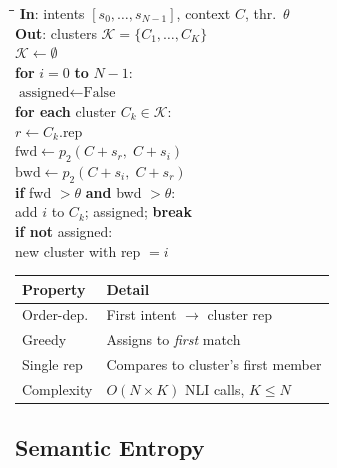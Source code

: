 \documentclass[10pt,a4paper,twocolumn]{article}
\begin{document}
\begin{algobox}[title=Greedy Sequential Clustering]
\begin{scriptsize}
\begin{tabbing}
\hspace{3mm}\=\hspace{3mm}\=\hspace{3mm}\=\kill
\textbf{In}: intents $[s_0, \ldots, s_{N-1}]$, context $C$, thr.\ $\theta$\\[2pt]
\textbf{Out}: clusters $\mathcal{K} = \{C_1, \ldots, C_K\}$\\[4pt]
$\mathcal{K} \leftarrow \emptyset$\\
\textbf{for} $i = 0$ \textbf{to} $N{-}1$:\\
\> $\text{assigned} \leftarrow \text{False}$\\
\> \textbf{for each} cluster $C_k \in \mathcal{K}$:\\
\>\> $r \leftarrow C_k.\text{rep}$\\
\>\> $\text{fwd} \leftarrow p_2(C{+}s_r,\; C{+}s_i)$\\
\>\> $\text{bwd} \leftarrow p_2(C{+}s_i,\; C{+}s_r)$\\
\>\> \textbf{if} fwd $> \theta$ \textbf{and} bwd $> \theta$:\\
\>\>\> add $i$ to $C_k$; assigned; \textbf{break}\\
\> \textbf{if not} assigned:\\
\>\> new cluster with rep $= i$
\end{tabbing}
\end{scriptsize}
\end{algobox}

\begin{scriptsize}
\begin{tabular}{@{}lp{}@{}}
\toprule
\textbf{Property} & \textbf{Detail} \\
\midrule
Order-dep. & First intent $\to$ cluster rep \\
Greedy & Assigns to \emph{first} match \\
Single rep & Compares to cluster's first member \\
Complexity & $O(N {\times} K)$ NLI calls, $K \le N$ \\
\bottomrule
\end{tabular}
\end{scriptsize}

\subsection{Semantic Entropy}
\end{document}
